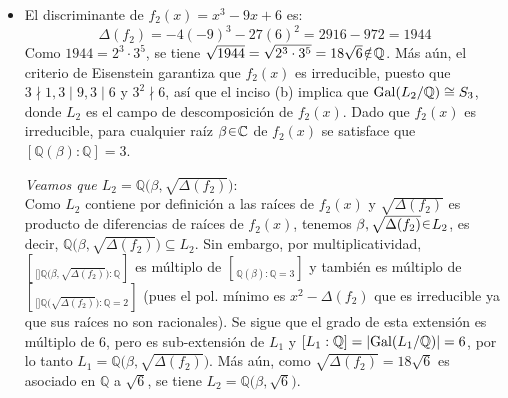\begin{sol}
\begin{enumerate}[label=\alph*)]
\begin{itemize}
    \item El discriminante de $f_2(x)=x^3-9x+6$ es:
    \[
    \Delta(f_2) = -4(-9)^3-27(6)^2 = 2916-972=1944
    \]
    Como $1944 = 2^3\cdot3^5$, se tiene $\sqrt{1944}=\sqrt{2^3\cdot3^5} = 18\sqrt{6}\noten\mathbb{Q}$. Más aún, el criterio de Eisenstein garantiza que $f_2(x)$ es irreducible, puesto que $3\nmid 1, 3\mid 9, 3\mid 6$ y $3^2 \nmid 6$, así que el inciso (b) implica que $\operatorname{Gal}(L_2/\mathbb{Q})\cong S_3$, donde $L_2$ es el campo de descomposición de $f_2(x)$. Dado que $f_2(x)$ es irreducible, para cualquier raíz $\beta\en\mathbb{C}$ de $f_2(x)$ se satisface que $[\mathbb{Q}(\beta):\mathbb{Q}]=3$.\par\vspace{1em}
    \emph{Veamos que $L_2 = \mathbb{Q}\big(\beta,\sqrt{\Delta(f_2)}\big)$}:\\
    Como $L_2$ contiene por definición a las raíces de $f_2(x)$ y $\sqrt{\Delta(f_2)}$ es producto de diferencias de raíces de $f_2(x)$, tenemos $\beta,\sqrt{\Delta(f_2)} \en L_2$, es decir, $\mathbb{Q}\big(\beta,\sqrt{\Delta(f_2)}\big) \subseteq L_2$. Sin embargo, por multiplicatividad, $\brack[\big]{\mathbb{Q}\big(\beta,\sqrt{\Delta(f_2)}\big) : \mathbb{Q}}$ es múltiplo de $\brack{\mathbb{Q}(\beta):\mathbb{Q}} = 3$ y también es múltiplo de $\brack[\big]{\mathbb{Q}\big(\sqrt{\Delta(f_2)}\big) : \mathbb{Q}} = 2$ (pues el pol. mínimo es $x^2 - \Delta(f_2)$ que es irreducible ya que sus raíces no son racionales). Se sigue que el grado de esta extensión es múltiplo de $6$, pero es sub-extensión de $L_1$ y $[L_1 : \mathbb{Q}] = \abs{\operatorname{Gal}(L_1/\mathbb{Q})} = 6$, por lo tanto $L_1 = \mathbb{Q}\big(\beta,\sqrt{\Delta(f_2)}\big)$. Más aún, como $\sqrt{\Delta(f_2)} = 18\sqrt{6}$ es asociado en $\mathbb{Q}$ a $\sqrt{6}$, se tiene $L_2 = \mathbb{Q}\big(\beta,\sqrt{6}\big)$.
\end{itemize}
\end{enumerate}
\end{sol}

